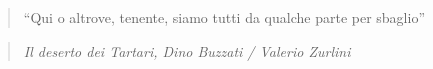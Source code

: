\documentclass[12pt,b5paper]{book}
\let\origdoublepage\cleardoublepage
\newcommand{\clearemptydoublepage}{%
  \clearpage
  {\pagestyle{empty}\origdoublepage}%
}
\begin{document}
\thispagestyle{empty}
\vspace*{\fill} 
\begin{quote} 
\centering 
``Qui o altrove, tenente, siamo tutti da qualche parte per sbaglio''
\end{quote}
\begin{quote} 
\centering 
\textit{Il deserto dei Tartari, Dino Buzzati / Valerio Zurlini}
\end{quote}
\begin{quote} 
\centering
\end{quote}
\vspace*{\fill}


\clearemptydoublepage
\newpage
\setcounter{tocdepth}{0}
\tableofcontents
\thispagestyle{empty}
\clearemptydoublepage %


\newpage
\renewcommand{\bibname}{References}











\end{document}
